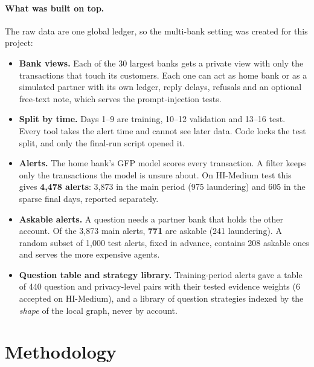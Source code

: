 \documentclass[11pt,a4paper]{article}
\begin{document}
\paragraph{What was built on top.} The raw data are one global ledger, so the multi-bank setting was created for this project:
\begin{itemize}
\item \textbf{Bank views.} Each of the 30 largest banks gets a private view with only the transactions that touch its customers. Each one can act as home bank or as a simulated partner with its own ledger, reply delays, refusals and an optional free-text note, which serves the prompt-injection tests.
\item \textbf{Split by time.} Days 1--9 are training, 10--12 validation and 13--16 test. Every tool takes the alert time and cannot see later data. Code locks the test split, and only the final-run script opened it.
\item \textbf{Alerts.} The home bank's GFP model scores every transaction. A filter keeps only the transactions the model is unsure about. On HI-Medium test this gives \textbf{4,478 alerts}: 3,873 in the main period (975 laundering) and 605 in the sparse final days, reported separately.
\item \textbf{Askable alerts.} A question needs a partner bank that holds the other account. Of the 3,873 main alerts, \textbf{771} are askable (241 laundering). A random subset of 1,000 test alerts, fixed in advance, contains 208 askable ones and serves the more expensive agents.
\item \textbf{Question table and strategy library.} Training-period alerts gave a table of 440 question and privacy-level pairs with their tested evidence weights (6 accepted on HI-Medium), and a library of question strategies indexed by the \emph{shape} of the local graph, never by account.
\end{itemize}

\section{Methodology}
\end{document}
